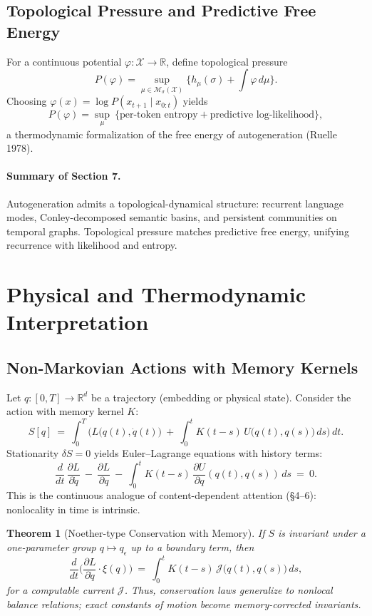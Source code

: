 \documentclass[12pt,a4paper,twoside,openright]{book}
\newtheorem{theorem}{Theorem}
\begin{document}
\subsection{Topological Pressure and Predictive Free Energy}
For a continuous potential $\varphi:\mathcal{X}\to\mathbb{R}$, define topological pressure
\[
P(\varphi)=\sup_{\mu\in\mathcal{M}_\sigma(\mathcal{X})}\Big\{h_\mu(\sigma)+\int \varphi\,d\mu\Big\}.
\]
Choosing $\varphi(x)=\log P(x_{t+1}\mid x_{0:t})$ yields
\[
P(\varphi)=\sup_\mu \ \Big\{\text{per-token entropy} + \text{predictive log-likelihood}\Big\},
\]
a thermodynamic formalization of the free energy of autogeneration (Ruelle 1978).

\paragraph{Summary of Section 7.}
Autogeneration admits a topological-dynamical structure: recurrent language modes, Conley-decomposed semantic basins, and persistent communities on temporal graphs.
Topological pressure matches predictive free energy, unifying recurrence with likelihood and entropy.

\section{Physical and Thermodynamic Interpretation}
\subsection{Non-Markovian Actions with Memory Kernels}
Let $q:[0,T]\to \mathbb{R}^d$ be a trajectory (embedding or physical state).
Consider the action with memory kernel $K$:
\begin{equation}
S[q]\ =\ \int_0^T \Big( L\big(q(t),\dot q(t)\big)\ +\ \int_0^t K(t-s)\,U\big(q(t),q(s)\big)\,ds \Big)\,dt.
\end{equation}
Stationarity $\delta S=0$ yields Euler–Lagrange equations with history terms:
\begin{equation}
\frac{d}{dt}\,\frac{\partial L}{\partial \dot q}
\ -\ \frac{\partial L}{\partial q}
\ -\ \int_0^t K(t-s)\,\frac{\partial U}{\partial q}(q(t),q(s))\,ds
\ =\ 0.
\end{equation}
This is the continuous analogue of content-dependent attention (§4–6): nonlocality in time is intrinsic.

\begin{theorem}[Noether-type Conservation with Memory]
If $S$ is invariant under a one-parameter group $q\mapsto q_\epsilon$ up to a boundary term, then
\[
\frac{d}{dt}\Big(\frac{\partial L}{\partial \dot q}\cdot \xi(q)\Big)
\ =\ \int_0^t K(t-s)\,\mathcal{J}\big(q(t),q(s)\big)\,ds,
\]
for a computable current $\mathcal{J}$.
Thus, conservation laws generalize to nonlocal balance relations; exact constants of motion become \emph{memory-corrected invariants}.
\end{theorem}
\end{document}
